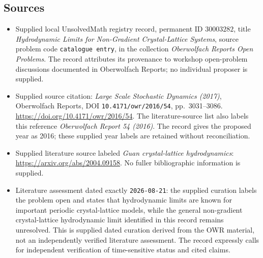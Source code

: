 \documentclass[11pt]{article}
\begin{document}
\subsection{Sources}
\begin{itemize}
\item Supplied local UnsolvedMath registry record, permanent ID \(30003282\), title \emph{Hydrodynamic Limits for Non-Gradient Crystal-Lattice Systems}, source problem code \texttt{catalogue entry}, in the collection \emph{Oberwolfach Reports Open Problems}. The record attributes its provenance to workshop open-problem discussions documented in Oberwolfach Reports; no individual proposer is supplied.
\item Supplied source citation: \emph{Large Scale Stochastic Dynamics (2017)}, Oberwolfach Reports, DOI \texttt{10.4171/owr/2016/54}, pp.\ 3031--3086. \url{https://doi.org/10.4171/owr/2016/54}. The literature-source list also labels this reference \emph{Oberwolfach Report 54 (2016)}. The record gives the proposed year as 2016; these supplied year labels are retained without reconciliation.
\item Supplied literature source labeled \emph{Guan crystal-lattice hydrodynamics}: \url{https://arxiv.org/abs/2004.09158}. No fuller bibliographic information is supplied.
\item Literature assessment dated exactly \texttt{2026-08-21}: the supplied curation labels the problem open and states that hydrodynamic limits are known for important periodic crystal-lattice models, while the general non-gradient crystal-lattice hydrodynamic limit identified in this record remains unresolved. This is supplied dated curation derived from the OWR material, not an independently verified literature assessment. The record expressly calls for independent verification of time-sensitive status and cited claims.
\end{itemize}
\end{document}
